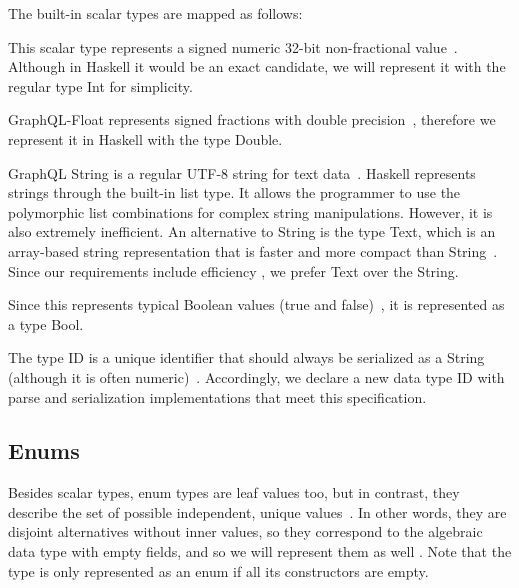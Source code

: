 The built-in scalar types are mapped as follows:

\begin{itemize}

   This scalar type represents a signed numeric 
    32-bit non-fractional value~\cite{gql-spec}. 
    Although in Haskell  
    it would be an exact candidate, we will represent it with the regular type Int for simplicity.

   GraphQL-Float represents signed fractions with 
    double precision~\cite{gql-spec}, 
    therefore we represent it in Haskell with the type Double.

   GraphQL String is a regular UTF-8 string for text data~\cite{gql-spec}. Haskell represents strings through the built-in list type. It allows the programmer to use the polymorphic list combinations for complex string manipulations.
  However, it is also extremely inefficient. An alternative to String is the type Text, which is an array-based string representation that is faster and more compact than String~\cite{string-vs-text,string-types-alexeyshmalko,string-types-fpcomplete,hackage-data-text}. 
  Since our requirements include efficiency , we prefer Text over the String.

  Since this represents typical Boolean values (true and false)~\cite{gql-spec}, it is represented as a type Bool.

   The type ID is a unique identifier that should always be serialized as a String (although it is often numeric)~\cite{gql-spec}. Accordingly, we declare a new data type ID with parse and serialization implementations that meet this specification.
\end{itemize}

\subsection{Enums}

Besides scalar types, enum types are leaf values too, but in contrast, they describe the set of possible independent, unique values~\cite{gql-spec}. In other words, they are disjoint alternatives without inner values, so they correspond to the algebraic data type with empty fields, and so we will represent them as well . Note that the type is only represented as an enum if all its constructors are empty.

